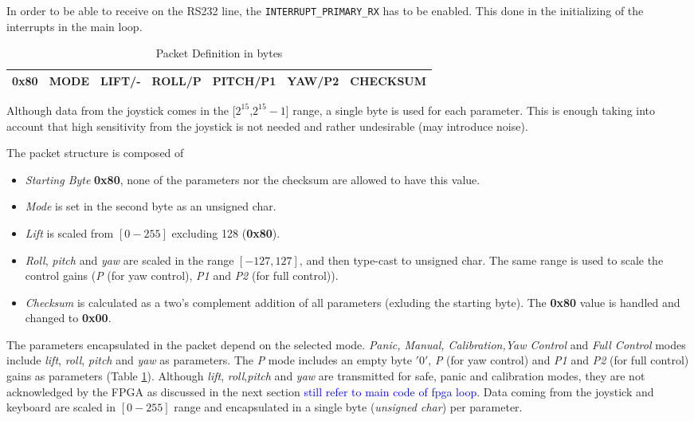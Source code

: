 \documentclass{article}
\newcommand\todo[1]{\textcolor{blue}{#1}} %
\begin{document}
In order to be able to receive on the RS232 line, the \texttt{INTERRUPT\_PRIMARY\_RX} has to be enabled. This done in the initializing of the interrupts in the main loop. 

\begin{table}[ht]
\centering
\begin{tabular}{|c|c|c|c|c|c|c|}
\hline 
0x80 & MODE & LIFT/- & ROLL/P & PITCH/P1 & YAW/P2 & CHECKSUM \\ 
\hline 
\end{tabular} 
\caption{Packet Definition in bytes}
\label{tbl:PkgDefinition}
\end{table}

Although data from the joystick comes in the [$2^{15}$,$2^{15}-1$] range, a single byte is used for each parameter. This is enough taking into account that high sensitivity from the joystick is not needed and rather undesirable (may introduce noise).

The packet structure is composed of
\begin{itemize}

\item{\emph{Starting Byte} \textbf{0x80}, none of the parameters nor the checksum are allowed to have this value.}

\item{\emph{Mode} is set in the second byte as an unsigned char.}

\item{\emph{Lift} is scaled from $[0-255]$ excluding 128 (\textbf{0x80}).}

\item{\emph{Roll}, \emph{pitch} and \emph{yaw} are scaled in the range $[-127,127]$, and then type-cast to unsigned char. The same range is used to scale the control gains (\emph{P} (for yaw control), \emph{P1} and \emph{P2} (for full control)).}

\item{\emph{Checksum} is calculated as a two's complement addition of all parameters (exluding the starting byte). The \textbf{0x80} value is handled and changed to \textbf{0x00}.}

\end{itemize}

The parameters encapsulated in the packet depend on the selected mode. \emph{Panic, Manual, Calibration,Yaw Control} and \emph{Full Control} modes include \emph{lift}, \emph{roll}, \emph{pitch} and \emph{yaw} as parameters. The \emph{P} mode includes an empty byte $'0'$, \emph{P} (for yaw control) and \emph{P1} and \emph{P2} (for full control) gains as parameters (Table \ref{tbl:PkgDefinition}). Although \emph{lift}, \emph{roll},\emph{pitch} and \emph{yaw} are transmitted for safe, panic and calibration modes, they are not acknowledged by the FPGA as discussed in the next section \todo{still refer to main code of fpga loop}. Data coming from the joystick and keyboard are scaled in $[0-255]$ range and encapsulated in a single byte (\emph{unsigned char}) per parameter.
\end{document}
